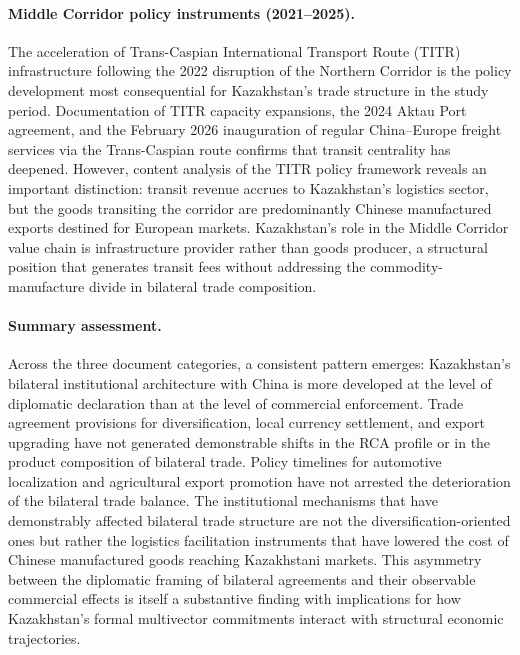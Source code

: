 \documentclass[12pt]{article}
\begin{document}
\paragraph{Middle Corridor policy instruments (2021--2025).} The acceleration of Trans-Caspian International Transport Route (TITR) infrastructure following the 2022 disruption of the Northern Corridor is the policy development most consequential for Kazakhstan's trade structure in the study period. Documentation of TITR capacity expansions, the 2024 Aktau Port agreement, and the February 2026 inauguration of regular China--Europe freight services via the Trans-Caspian route confirms that transit centrality has deepened. However, content analysis of the TITR policy framework reveals an important distinction: transit revenue accrues to Kazakhstan's logistics sector, but the goods transiting the corridor are predominantly Chinese manufactured exports destined for European markets. Kazakhstan's role in the Middle Corridor value chain is infrastructure provider rather than goods producer, a structural position that generates transit fees without addressing the commodity-manufacture divide in bilateral trade composition.

\paragraph{Summary assessment.} Across the three document categories, a consistent pattern emerges: Kazakhstan's bilateral institutional architecture with China is more developed at the level of diplomatic declaration than at the level of commercial enforcement. Trade agreement provisions for diversification, local currency settlement, and export upgrading have not generated demonstrable shifts in the RCA profile or in the product composition of bilateral trade. Policy timelines for automotive localization and agricultural export promotion have not arrested the deterioration of the bilateral trade balance. The institutional mechanisms that have demonstrably affected bilateral trade structure are not the diversification-oriented ones but rather the logistics facilitation instruments that have lowered the cost of Chinese manufactured goods reaching Kazakhstani markets. This asymmetry between the diplomatic framing of bilateral agreements and their observable commercial effects is itself a substantive finding with implications for how Kazakhstan's formal multivector commitments interact with structural economic trajectories.

\end{document}
